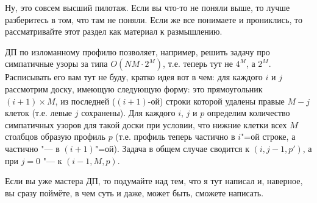  Ну, это совсем высший пилотаж. Если вы что-то не поняли выше, то лучше разберитесь
в том, что там не поняли. Если же все понимаете и прониклись, то рассматривайте этот раздел как материал к размышлению.

ДП по изломанному профилю позволяет, например, решить задачу про 
симпатичные узоры за типа $O(NM\cdot 2^M)$, т.е. теперь тут не $4^M$, а $2^M$. Расписывать его вам тут не буду,
кратко идея вот в чем: для каждого $i$ и $j$ рассмотрим доску, имеющую следующую форму:
это прямоугольник $(i+1)\times M$, из последней ($(i+1)$-ой) строки которой удалены правые $M-j$ клеток (т.е. левые $j$ сохранены).
Для каждого $i$, $j$ и $p$ определим количество симпатичных узоров для такой доски при условии, что нижние клетки всех $M$ столбцов
образую профиль $p$ (т.е. профиль теперь частично в $i$"=ой строке, а частично "--- в $(i+1)$"=ой). Задача в общем случае сводится
к $(i,j-1,p')$, а при $j=0$ "--- к $(i-1,M,p)$. 

Если вы уже мастера ДП, то подумайте над тем, что я тут написал и, наверное, вы сразу поймёте, в чем суть и даже, может
быть, сможете написать.
